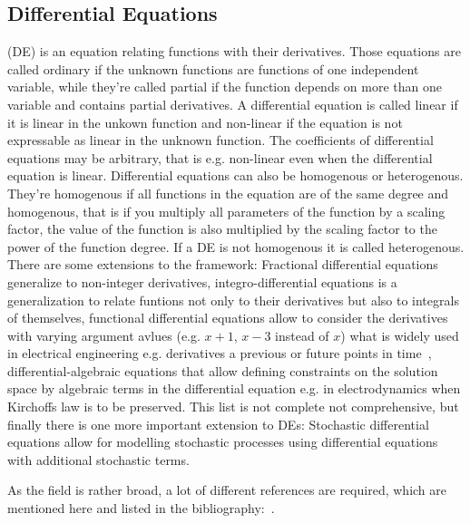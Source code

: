 \documentclass[11pt, rgb]{scrartcl}
\begin{document}
\subsection{Differential Equations} (DE) is an equation relating functions with their derivatives. 
Those equations are called ordinary if the unknown functions are functions of one independent variable, while they're called partial if the function depends on more than one variable and contains partial derivatives. 
A differential equation is called linear if it is linear in the unkown function and non-linear if the equation is not expressable as linear in the unknown function. 
The coefficients of differential equations may be arbitrary, that is e.g. non-linear even when the differential equation is linear. 
Differential equations can also be homogenous or heterogenous. 
They're homogenous if all functions in the equation are of the same degree and homogenous, that is if you multiply all parameters of the function by a scaling factor, the value of the function is also multiplied by the scaling factor to the power of the function degree. 
If a DE is not homogenous it is called heterogenous. 
There are some extensions to the framework: 
Fractional differential equations generalize to non-integer derivatives, integro-differential equations is a generalization to relate funtions not only to their derivatives but also to integrals of themselves, functional differential equations allow to consider the derivatives with varying argument avlues (e.g. $x+1$, $x-3$ instead of $x$) what is widely used in electrical engineering e.g. derivatives a previous or future points in time~\autocite{richard}, differential-algebraic equations that allow defining constraints on the solution space by algebraic terms in the differential equation e.g. in electrodynamics when Kirchoffs law is to be preserved. 
This list is not complete not comprehensive, but finally there is one more important extension to DEs: 
Stochastic differential equations allow for modelling stochastic processes using differential equations with additional stochastic terms. 

As the field is rather broad, a lot of different references are required, which are mentioned here and listed in the bibliography:~\autocite{dae, ode_dae, dtsp, fde, handbook_de, ide, nlc, simmons_de, sde}. 
\end{document}

